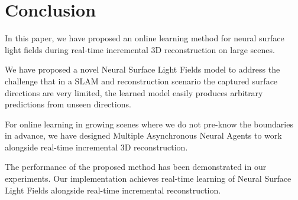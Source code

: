 \documentclass[letterpaper, 10 pt, journal, twoside]{IEEEtran}  %
\begin{document}


\vspace{-.2cm}
\section{Conclusion}
In this paper, we have proposed an online learning method for neural surface light fields during real-time incremental 3D reconstruction on large scenes.

We have proposed a novel Neural Surface Light Fields model to address the challenge that in a SLAM and reconstruction scenario the captured surface directions are very limited, the learned model easily produces arbitrary predictions from unseen directions.

For online learning in growing scenes where we do not pre-know the boundaries in advance, we have designed Multiple Asynchronous Neural Agents to work alongside real-time incremental 3D reconstruction.

The performance of the proposed method has been demonstrated in our experiments.
Our implementation achieves real-time learning of Neural Surface Light Fields alongside real-time incremental reconstruction.

{\small
	
	
}
\end{document}
